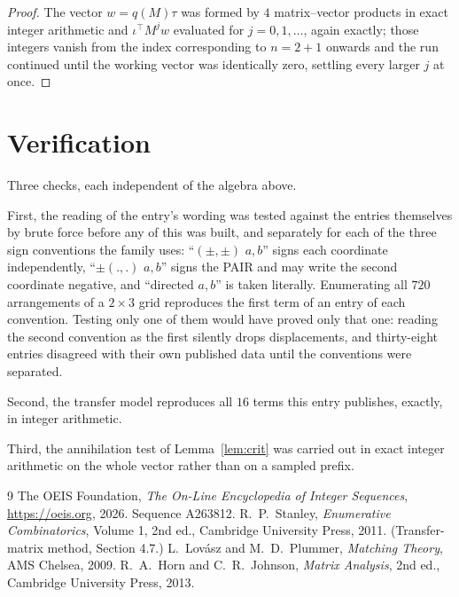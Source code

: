 \documentclass[11pt,a4paper]{article}
\theoremstyle{plain}
\theoremstyle{definition}
\begin{document}
\begin{proof}
The vector $w=q(M)\tau$ was formed by $4$ matrix--vector products in exact integer
arithmetic and $\iota^{\!\top}M^{j}w$ evaluated for $j=0,1,\dots$, again exactly; those
integers vanish from the index corresponding to $n=2+1$ onwards and the run continued
until the working vector was identically zero, settling every larger $j$ at once.
\end{proof}

\section{Verification}

Three checks, each independent of the algebra above.

First, the reading of the entry's wording was tested against the entries themselves by brute
force before any of this was built, and separately for each of the three sign conventions the
family uses: ``$(\pm,\pm)$ $a,b$'' signs each coordinate independently, ``$\pm(.,.)$ $a,b$''
signs the PAIR and may write the second coordinate negative, and ``directed $a,b$'' is taken
literally. Enumerating all $720$ arrangements of a $2\times3$ grid reproduces the first term
of an entry of each convention. Testing only one of them would have proved only that one:
reading the second convention as the first silently drops displacements, and thirty-eight
entries disagreed with their own published data until the conventions were separated.

Second, the transfer model reproduces all $16$ terms this entry publishes, exactly, in
integer arithmetic.

Third, the annihilation test of Lemma~\ref{lem:crit} was carried out in exact integer
arithmetic on the whole vector rather than on a sampled prefix.

\begin{thebibliography}{9}
 The OEIS Foundation, \emph{The On-Line Encyclopedia of Integer
Sequences}, \url{https://oeis.org}, 2026. Sequence A263812.
 R.~P.~Stanley, \emph{Enumerative Combinatorics}, Volume 1, 2nd ed.,
Cambridge University Press, 2011. (Transfer-matrix method, Section 4.7.)
 L.~Lov\'asz and M.~D.~Plummer, \emph{Matching Theory}, AMS Chelsea, 2009.
 R.~A.~Horn and C.~R.~Johnson, \emph{Matrix Analysis}, 2nd ed., Cambridge
University Press, 2013.
\end{thebibliography}
\end{document}
